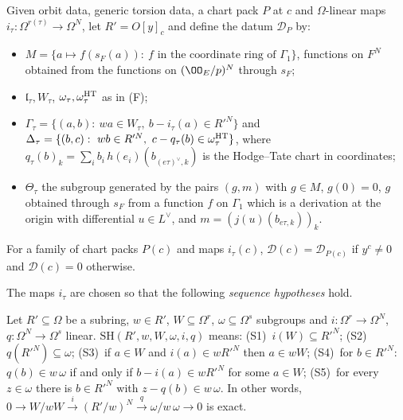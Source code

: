\begin{definition}\label{pf:tower:def-chartD}
Given orbit data, generic torsion data, a chart pack $P$ at $c$ and $\Omega$-linear maps
$i_\tau\colon\Omega^{r(\tau)}\to\Omega^N$, let $R'=O[y]_c$ and define the datum $\mathcal D_P$ by:
\begin{itemize}
\item $M=\{a\mapsto f(s_F(a)):\ f\text{ in the coordinate ring of }\Gamma_1\}$, functions on $F^N$
  obtained from the functions on $(\OO_E/p)^N$ through $s_F$;
\item $\mathfrak l_\tau,W_\tau$, $\omega_\tau,\omega^{\mathrm{HT}}_\tau$ as in (F);
\item $\Gamma_\tau=\{(a,b):\ wa\in W_\tau,\ b-i_\tau(a)\in R'^N\}$ and
  $\Delta_\tau=\{(b,c):\ wb\in R'^N,\ c-q_\tau(b)\in\omega^{\towerHT}_\tau\}$, where
  $q_\tau(b)_k=\sum_ib_i\,h(e_i)(b_{(e\tau)^\vee,k})$ is the Hodge--Tate chart in coordinates;
\item $\Theta_\tau$ the subgroup generated by the pairs $(g,m)$ with $g\in M$, $g(0)=0$, $g$ obtained through
  $s_F$ from a function $f$ on $\Gamma_1$ which is a derivation at the origin with differential $u\in L^\vee$,
  and $m=(j(u)(b_{e\tau,k}))_k$.
\end{itemize}
For a family of chart packs $P(c)$ and maps $i_\tau(c)$, $\mathcal D(c)=\mathcal D_{P(c)}$ if $y^c\ne0$ and
$\mathcal D(c)=0$ otherwise.
\end{definition}

The maps $i_\tau$ are chosen so that the following \emph{sequence hypotheses} hold.

\begin{definition}\label{pf:tower:def-seq}
Let $R'\subseteq\Omega$ be a subring, $w\in R'$, $W\subseteq\Omega^r$, $\omega\subseteq\Omega^s$ subgroups and
$i\colon\Omega^r\to\Omega^N$, $q\colon\Omega^N\to\Omega^s$ linear. $\mathrm{SH}(R',w,W,\omega,i,q)$ means:
(S1)~$i(W)\subseteq R'^N$; (S2)~$q(R'^N)\subseteq\omega$; (S3)~if $a\in W$ and $i(a)\in wR'^N$ then $a\in wW$;
(S4)~for $b\in R'^N$: $q(b)\in w\,\omega$ if and only if $b-i(a)\in wR'^N$ for some $a\in W$; (S5)~for every
$z\in\omega$ there is $b\in R'^N$ with $z-q(b)\in w\,\omega$.
In other words, $0\to W/wW\xrightarrow{i}(R'/w)^N\xrightarrow{q}\omega/w\,\omega\to0$ is exact.
\end{definition}

